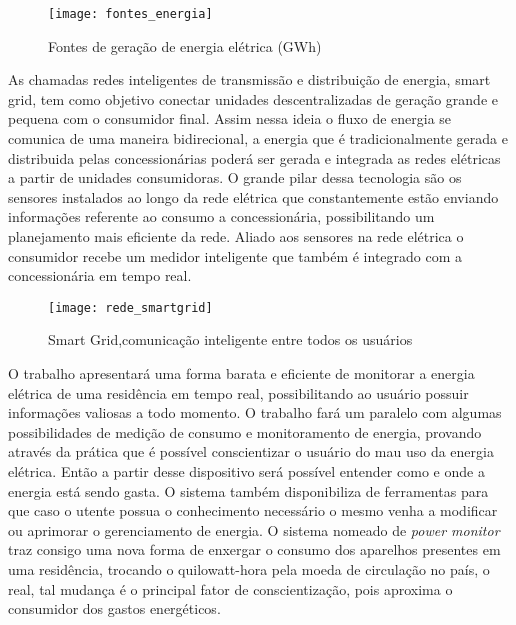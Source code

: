 \begin{figure}[h!]
	\texttt{[image: fontes\_energia]}
	\centering
	\caption[Fontes de geração de energia elétrica (GWh)]{Fontes de geração de energia elétrica (GWh)}
	\label{fig:fonte_energia}
\end{figure}
\FloatBarrier

As chamadas redes inteligentes de transmissão e distribuição de energia, smart grid, tem como objetivo conectar unidades descentralizadas de geração
grande e pequena com o consumidor final. Assim nessa ideia o fluxo de energia se comunica de uma maneira bidirecional, a energia que é tradicionalmente
gerada e distribuida pelas concessionárias poderá ser gerada e integrada as redes elétricas a partir de unidades consumidoras. O grande pilar dessa 
tecnologia são os sensores instalados ao longo da rede elétrica que constantemente estão enviando informações referente ao consumo a concessionária,
possibilitando um planejamento mais eficiente da rede. Aliado aos sensores na rede elétrica o consumidor recebe um medidor inteligente que também
é integrado com a concessionária em tempo real.

\begin{figure}[h!]
	\texttt{[image: rede\_smartgrid]}
	\centering
	\caption[Smart Grid,comunicação inteligente entre todos os usuários]{Smart Grid,comunicação inteligente entre todos os usuários}
	\label{fig:rede_smartgrid}
\end{figure}
\FloatBarrier

O trabalho apresentará uma forma barata e eficiente de monitorar a energia elétrica de uma residência em tempo real, possibilitando ao usuário
possuir informações valiosas a todo momento. O trabalho fará um paralelo com algumas possibilidades de medição de consumo e monitoramento
de energia, provando através da prática que é possível conscientizar o usuário do mau uso da energia elétrica.
Então a partir desse dispositivo será possível entender como e onde a energia está sendo gasta. O sistema também disponibiliza de ferramentas para que 
caso o utente possua o conhecimento necessário o mesmo venha a modificar ou aprimorar o gerenciamento de energia. O sistema nomeado de \textit{power monitor}
traz consigo uma nova forma de enxergar o consumo dos aparelhos presentes em uma residência, trocando o quilowatt-hora pela moeda de circulação no país,
o real, tal mudança é o principal fator de conscientização, pois aproxima o consumidor dos gastos energéticos.


